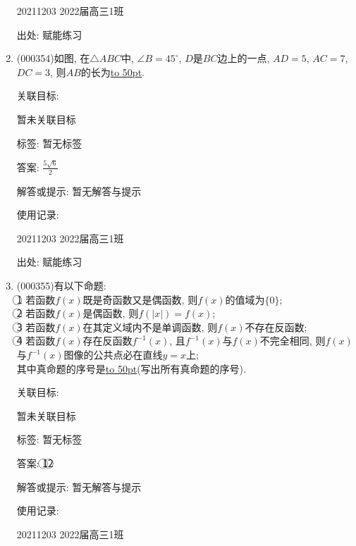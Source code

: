 \documentclass[10pt,a4paper]{article}
\newcommand{\blank}[1]{\underline{\hbox to #1pt{}}}
\begin{document}
\begin{enumerate}[1.]
20211203	2022届高三1班	


出处: 赋能练习
\item { (000354)}如图, 在$\triangle ABC$中, $\angle B=45^\circ$, $D$是$BC$边上的一点, $AD=5$, $AC=7$, $DC=3$, 则$AB$的长为\blank{50}.
\begin{center}
\end{center}


关联目标:

暂未关联目标



标签: 暂无标签

答案: $\frac{5\sqrt 6}2$

解答或提示: 暂无解答与提示

使用记录:

20211203	2022届高三1班	


出处: 赋能练习
\item { (000355)}有以下命题:\\
\textcircled{1} 若函数$f(x)$既是奇函数又是偶函数, 则$f(x)$的值域为$\{0\}$; \\
\textcircled{2} 若函数$f(x)$是偶函数, 则$f(|x|)=f(x)$;\\
\textcircled{3} 若函数$f(x)$在其定义域内不是单调函数, 则$f(x)$不存在反函数;\\
\textcircled{4} 若函数$f(x)$存在反函数${{f}^{-1}}(x)$, 且${{f}^{-1}}(x)$与$f(x)$不完全相同, 则$f(x)$与${{f}^{-1}}(x)$图像的公共点必在直线$y=x$上; \\
其中真命题的序号是\blank{50}(写出所有真命题的序号).


关联目标:

暂未关联目标



标签: 暂无标签

答案: \textcircled{1}\textcircled{2}

解答或提示: 暂无解答与提示

使用记录:

20211203	2022届高三1班	


\end{enumerate}
\end{document}
